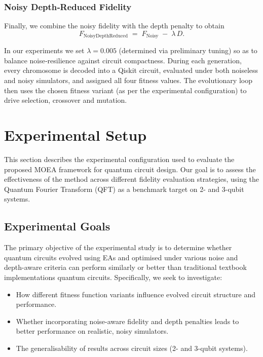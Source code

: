 \documentclass[11pt,a4paper]{article}
\begin{document}
\subsubsection*{Noisy Depth‐Reduced Fidelity}

Finally, we combine the noisy fidelity with the depth penalty to obtain
\begin{equation}
  F_{\mathrm{NoisyDepthReduced}}
  \;=\;F_{\mathrm{Noisy}}\;-\;\lambda\,D.
\end{equation}

In our experiments we set $\lambda=0.005$ (determined via preliminary tuning) so as to balance noise‑resilience against circuit compactness.  During each generation, every chromosome is decoded into a Qiskit circuit, evaluated under both noiseless and noisy simulators, and assigned all four fitness values.  The evolutionary loop then uses the chosen fitness variant (as per the experimental configuration) to drive selection, crossover and mutation.

%
%
\section{Experimental Setup} \label{sec:experimental}

This section describes the experimental configuration used to evaluate the proposed MOEA framework for quantum circuit design. Our goal is to assess the effectiveness of the method across different fidelity evaluation strategies, using the Quantum Fourier Transform (QFT) as a benchmark target on 2- and 3-qubit systems.

\subsection{Experimental Goals}
The primary objective of the experimental study is to determine whether quantum circuits evolved using EAs and optimised under various noise and depth-aware criteria can perform similarly or better than traditional textbook implementations quantum circuits. Specifically, we seek to investigate:
\begin{itemize}
    \item How different fitness function variants influence evolved circuit structure and performance.
    \item Whether incorporating noise-aware fidelity and depth penalties leads to better performance on realistic, noisy simulators.
    \item The generalisability of results across circuit sizes (2- and 3-qubit systems).
\end{itemize}
\end{document}
